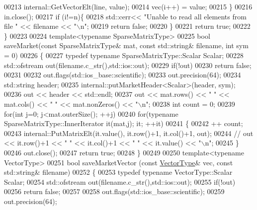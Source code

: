 \begin{DoxyCode}
{{{00213     internal::GetVectorElt(line, value); 
00214     vec(i++) = value; 
00215   \}
00216   in.close();
00217   \textcolor{keywordflow}{if} (i!=n)\{
00218     std::cerr<< \textcolor{stringliteral}{"Unable to read all elements from file "} << filename << \textcolor{stringliteral}{"\(\backslash\)n"};
00219     \textcolor{keywordflow}{return} \textcolor{keyword}{false};
00220   \}
00221   \textcolor{keywordflow}{return} \textcolor{keyword}{true};
00222 \}
00223 
00224 \textcolor{keyword}{template}<\textcolor{keyword}{typename} SparseMatrixType>
00225 \textcolor{keywordtype}{bool} saveMarket(\textcolor{keyword}{const} SparseMatrixType& mat, \textcolor{keyword}{const} std::string& filename, \textcolor{keywordtype}{int} sym = 0)
00226 \{
00227   \textcolor{keyword}{typedef} \textcolor{keyword}{typename} SparseMatrixType::Scalar Scalar;
00228   std::ofstream out(filename.c\_str(),std::ios::out);
00229   \textcolor{keywordflow}{if}(!out)
00230     \textcolor{keywordflow}{return} \textcolor{keyword}{false};
00231   
00232   out.flags(std::ios\_base::scientific);
00233   out.precision(64);
00234   std::string header; 
00235   internal::putMarketHeader<Scalar>(header, sym); 
00236   out << header << std::endl; 
00237   out << mat.rows() << \textcolor{stringliteral}{" "} << mat.cols() << \textcolor{stringliteral}{" "} << mat.nonZeros() << \textcolor{stringliteral}{"\(\backslash\)n"};
00238   \textcolor{keywordtype}{int} count = 0;
00239   \textcolor{keywordflow}{for}(\textcolor{keywordtype}{int} j=0; j<mat.outerSize(); ++j)
00240     \textcolor{keywordflow}{for}(\textcolor{keyword}{typename} SparseMatrixType::InnerIterator it(mat,j); it; ++it)
00241     \{
00242       ++ count;
00243       internal::PutMatrixElt(it.value(), it.row()+1, it.col()+1, out);
00244       \textcolor{comment}{// out << it.row()+1 << " " << it.col()+1 << " " << it.value() << "\(\backslash\)n";}
00245     \}
00246   out.close();
00247   \textcolor{keywordflow}{return} \textcolor{keyword}{true};
00248 \}
00249 
00250 \textcolor{keyword}{template}<\textcolor{keyword}{typename} VectorType>
00251 \textcolor{keywordtype}{bool} saveMarketVector (\textcolor{keyword}{const} \hyperlink{struct_vector_type}{VectorType}& vec, \textcolor{keyword}{const} std::string& filename)
00252 \{
00253  \textcolor{keyword}{typedef} \textcolor{keyword}{typename} VectorType::Scalar Scalar; 
00254  std::ofstream out(filename.c\_str(),std::ios::out);
00255   \textcolor{keywordflow}{if}(!out)
00256     \textcolor{keywordflow}{return} \textcolor{keyword}{false};
00257   
00258   out.flags(std::ios\_base::scientific);
00259   out.precision(64);
}}}
\end{DoxyCode}
